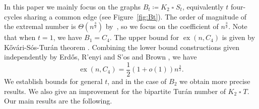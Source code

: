 \documentclass[11pt,a4paper]{article}
\newtheorem{theorem}{Theorem}[section]
\newtheorem{corollary}[theorem]{Corollary}
\theoremstyle{definition}
\DeclareMathOperator{\ex}{ex}
\begin{document}

  In this paper we mainly focus on the graphs $B_t \coloneq K_2 \mathbin{\square} S_t$, equivalently $t$ four-cycles sharing a common edge (see Figure~\ref{fig:Bt}). The order of magnitude of the extremal number is $\Theta(n^{\frac{3}{2}})$ by~\cite{bradavc2023turan}, so we focus on the coefficient of $n^{\frac{3}{2}}$.  
  Note that when $t=1$, we have $B_1 = C_4$.
  The upper bound for $\ex(n, C_4)$ is given by K\H{o}v\'{a}ri-S\'{o}s-Tur\'{a}n theorem \cite{kst}.
  Combining the lower bound constructions given independently by Erd\H{o}s, R'{e}nyi and S'{o}s \cite{ErdosOn1966} and Brown \cite{BrownOn1966}, we have
  \begin{equation*}
      \ex(n, C_4) = \frac{1}{2}(1+o(1))n^{\frac{3}{2}}.
  \end{equation*}
  We establish bounds for general $t$, and in the case of $B_2$ we  obtain more precise results. We also give an improvement for the bipartite Tur\'an number of $K_2\mathbin{\square} T$. Our main results are the following.


\end{document}
